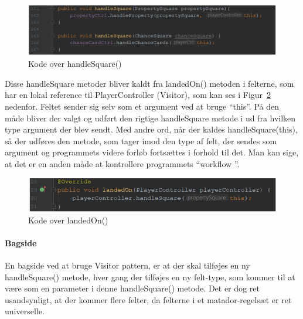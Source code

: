 \documentclass[class=article, crop=false]{standalone}
\begin{document}
        \begin{figure}[H]
        \centering
        \includegraphics[scale=0.5]{pics/handle_square.png}
        \caption{Kode over handleSquare()}\label{fig:handle_square}
    \end{figure}
        Disse handleSquare metoder bliver kaldt fra landedOn() metoden i felterne, som har en lokal reference til PlayerController (Visitor), som kan ses i Figur~\ref{fig:landed_on} nedenfor. Feltet sender sig selv som et argument ved at bruge “this”. På den måde bliver der valgt og udført den rigtige handleSquare metode i ud fra hvilken type argument der blev sendt. Med andre ord, når der kaldes handleSquare(this), så der udføres den metode, som tager imod den type af felt, der sendes som argument og programmets videre forløb fortsættes i forhold til det. Man kan sige, at det er en anden måde at kontrollere programmets “workflow ”.
        \begin{figure}[H]
            \centering
            \includegraphics[scale=0.6]{pics/landed_on.PNG}
            \caption{Kode over landedOn()}\label{fig:landed_on}
        \end{figure}


       \paragraph{Bagside \newline}
        En bagside ved at bruge Visitor pattern, er at der skal tilføjes en ny handleSquare() metode, hver gang der tilføjes en ny felt-type, som kommer til at være som en parameter i denne handleSquare() metode. Det er dog ret usandsynligt, at der kommer flere felter, da felterne i et matador-regelsæt er ret universelle.
\end{document}
